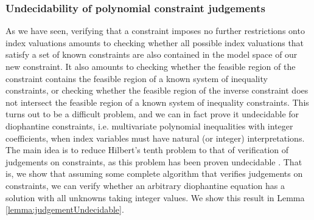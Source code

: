 
% 

\subsubsection{Undecidability of polynomial constraint judgements}
As we have seen, verifying that a constraint imposes no further restrictions onto index valuations amounts to checking whether all possible index valuations that satisfy a set of known constraints are also contained in the model space of our new constraint. It also amounts to checking whether the feasible region of the constraint contains the feasible region of a known system of inequality constraints, or checking whether the feasible region of the inverse constraint does not intersect the feasible region of a known system of inequality constraints. This turns out to be a difficult problem, and we can in fact prove it undecidable for diophantine constraints, i.e. multivariate polynomial inequalities with integer coefficients, when index variables must have natural (or integer) interpretations. The main idea is to reduce Hilbert's tenth problem \cite{Hilbert1902} to that of verification of judgements on constraints, as this problem has been proven undecidable \cite{Davis1973}. That is, we show that assuming some complete algorithm that verifies judgements on constraints, we can verify whether an arbitrary diophantine equation has a solution with all unknowns taking integer values. We show this result in Lemma \ref{lemma:judgementUndecidable}.
%
